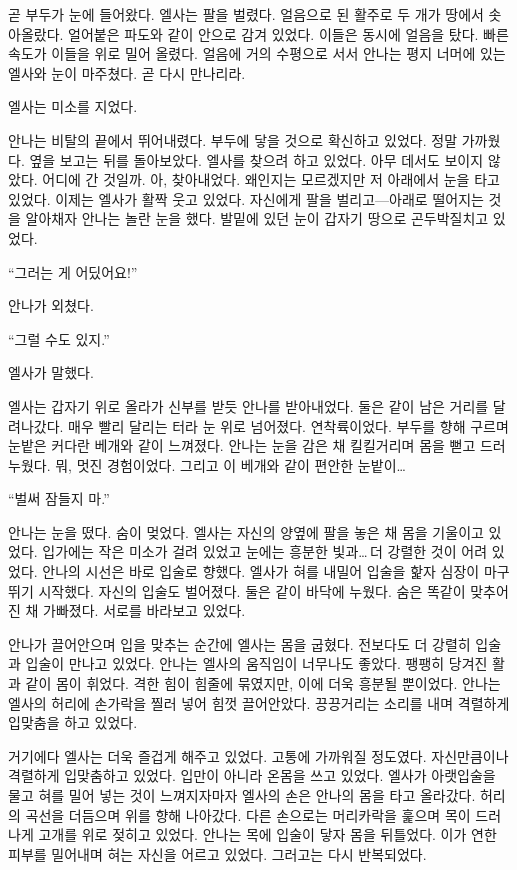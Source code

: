 곧 부두가 눈에 들어왔다. 엘사는 팔을 벌렸다. 얼음으로 된 활주로 두 개가 땅에서 솟아올랐다. 얼어붙은 파도와 같이 안으로 감겨 있었다. 이들은 동시에 얼음을 탔다. 빠른 속도가 이들을 위로 밀어 올렸다. 얼음에 거의 수평으로 서서 안나는 평지 너머에 있는 엘사와 눈이 마주쳤다. 곧 다시 만나리라.

엘사는 미소를 지었다.

안나는 비탈의 끝에서 뛰어내렸다. 부두에 닿을 것으로 확신하고 있었다. 정말 가까웠다. 옆을 보고는 뒤를 돌아보았다. 엘사를 찾으려 하고 있었다. 아무 데서도 보이지 않았다. 어디에 간 것일까. 아, 찾아내었다. 왜인지는 모르겠지만 저 아래에서 눈을 타고 있었다. 이제는 엘사가 활짝 웃고 있었다. 자신에게 팔을 벌리고—아래로 떨어지는 것을 알아채자 안나는 놀란 눈을 했다. 발밑에 있던 눈이 갑자기 땅으로 곤두박질치고 있었다.

``그러는 게 어딨어요!''

안나가 외쳤다.

``그럴 수도 있지.''

엘사가 말했다.

엘사는 갑자기 위로 올라가 신부를 받듯 안나를 받아내었다. 둘은 같이 남은 거리를 달려나갔다. 매우 빨리 달리는 터라 눈 위로 넘어졌다. 연착륙이었다. 부두를 향해 구르며 눈밭은 커다란 베개와 같이 느껴졌다. 안나는 눈을 감은 채 킬킬거리며 몸을 뻗고 드러누웠다. 뭐, 멋진 경험이었다. 그리고 이 베개와 같이 편안한 눈밭이\ldots

``벌써 잠들지 마.''

안나는 눈을 떴다. 숨이 멎었다. 엘사는 자신의 양옆에 팔을 놓은 채 몸을 기울이고 있었다. 입가에는 작은 미소가 걸려 있었고 눈에는 흥분한 빛과\ldots\,더 강렬한 것이 어려 있었다. 안나의 시선은 바로 입술로 향했다. 엘사가 혀를 내밀어 입술을 핥자 심장이 마구 뛰기 시작했다. 자신의 입술도 벌어졌다. 둘은 같이 바닥에 누웠다. 숨은 똑같이 맞추어진 채 가빠졌다. 서로를 바라보고 있었다.

안나가 끌어안으며 입을 맞추는 순간에 엘사는 몸을 굽혔다. 전보다도 더 강렬히 입술과 입술이 만나고 있었다. 안나는 엘사의 움직임이 너무나도 좋았다. 팽팽히 당겨진 활과 같이 몸이 휘었다. 격한 힘이 힘줄에 묶였지만, 이에 더욱 흥분될 뿐이었다. 안나는 엘사의 허리에 손가락을 찔러 넣어 힘껏 끌어안았다. 끙끙거리는 소리를 내며 격렬하게 입맞춤을 하고 있었다.

거기에다 엘사는 더욱 즐겁게 해주고 있었다. 고통에 가까워질 정도였다. 자신만큼이나 격렬하게 입맞춤하고 있었다. 입만이 아니라 온몸을 쓰고 있었다. 엘사가 아랫입술을 물고 혀를 밀어 넣는 것이 느껴지자마자 엘사의 손은 안나의 몸을 타고 올라갔다. 허리의 곡선을 더듬으며 위를 향해 나아갔다. 다른 손으로는 머리카락을 훑으며 목이 드러나게 고개를 위로 젖히고 있었다. 안나는 목에 입술이 닿자 몸을 뒤틀었다. 이가 연한 피부를 밀어내며 혀는 자신을 어르고 있었다. 그러고는 다시 반복되었다.

